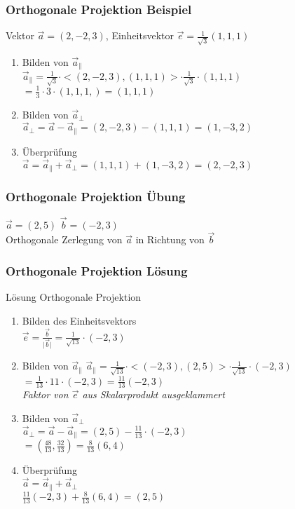 \begin{frame}
	\frametitle{Orthogonale Projektion Beispiel}
	Vektor $\vec{a} = (2, -2, 3)$, Einheitsvektor $\vec{e} = \frac{1}{\sqrt{3}}(1, 1, 1)$\\

    \begin{enumerate}
        \item Bilden von $\vec{a}_{\parallel}$\\
        $\vec{a}_{\parallel} = \frac{1}{\sqrt{3}} \cdot <(2, -2, 3), (1, 1, 1)> \cdot \frac{1}{\sqrt{3}} \cdot (1, 1, 1)$
        $= \frac{1}{3} \cdot 3 \cdot (1, 1, 1,) = (1, 1, 1)$
        \item Bilden von $\vec{a}_{\perp}$\\
        $\vec{a}_{\perp} = \vec{a} - \vec{a}_{\parallel} = (2, -2, 3) - (1, 1, 1) = (1, -3 , 2)$
        \item Überprüfung\\
        $\vec{a} = \vec{a}_{\parallel} + \vec{a}_{\perp} = (1, 1, 1) + (1, -3, 2) = (2, -2, 3)$
    \end{enumerate}
\end{frame}
	

\begin{frame}
	\frametitle{Orthogonale Projektion Übung}
	$\vec{a} = (2, 5)$ $\vec{b} = (-2, 3)$\\
	Orthogonale Zerlegung von $\vec{a}$ in Richtung von $\vec{b}$
\end{frame}


\begin{frame}
	\frametitle{Orthogonale Projektion Lösung}
	Lösung Orthogonale Projektion\\
    \begin{enumerate}
        \item Bilden des Einheitsvektors \\
        $\vec{e} = \frac{\vec{b}}{\lvert \vec{b} \rvert} = \frac{1}{\sqrt{13}} \cdot (-2, 3)$\\
        \item Bilden von $\vec{a}_{\parallel}$
        $\vec{a}_{\parallel} = \frac{1}{\sqrt{13}} \cdot <(-2, 3), (2, 5)> \cdot \frac{1}{\sqrt{13}} \cdot (-2, 3)$ \\
        $= \frac{1}{13} \cdot 11 \cdot (-2, 3) = \frac{11}{13}(-2, 3)$\\
        \textit{Faktor von $\vec{e}$  aus Skalarprodukt ausgeklammert}\\
        \item Bilden von $\vec{a}_{\perp}$ \\
        $\vec{a}_{\perp} = \vec{a} - \vec{a}_{\parallel} = (2, 5) - \frac{11}{13} \cdot (-2, 3)$\\
        $= (\frac{48}{13}, \frac{32}{13}) = \frac{8}{13}(6, 4)$\\
        \item Überprüfung \\
        $\vec{a} = \vec{a}_{\parallel} + \vec{a}_{\perp}$\\
        $\frac{11}{13}(-2, 3) + \frac{8}{13}(6, 4) = (2, 5)$ \\
    \end{enumerate}
\end{frame}
